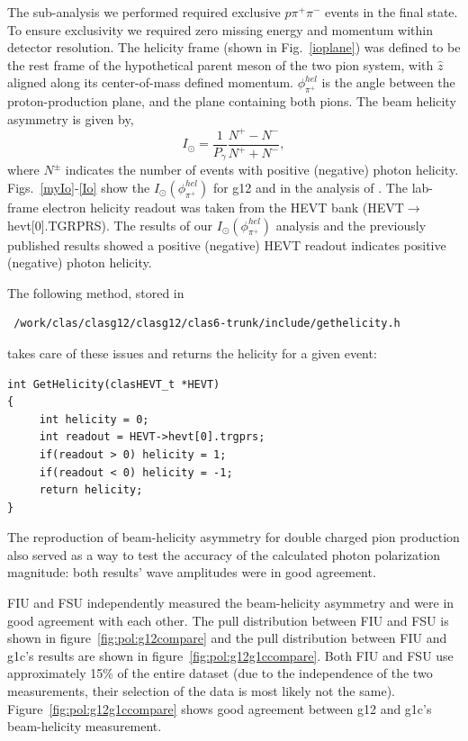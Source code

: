 The sub-analysis we performed required exclusive $p \pi^+ \pi^-$ events in the final state. To ensure exclusivity we required zero missing energy and momentum within detector resolution. The helicity frame (shown in Fig.~\ref{ioplane}) was defined to be the rest frame of the hypothetical parent meson of the two pion system, with  $\hat{z}$ aligned along its center-of-mass defined momentum. $\phi^{hel}_{\pi^+}$ is the angle between the proton-production plane, and the plane containing both pions. The beam helicity asymmetry is given by,
\begin{equation}
I_\odot = \frac{1}{P_{\gamma}} \frac{N^+ - N^-}{N^+ + N^-},
\end{equation}
where $N^\pm$ indicates the number of events with positive (negative) photon helicity.  Figs.~\ref{myIo}-\ref{Io} show the $I_{\odot}(\phi^{hel}_{\pi^+})$ for g12 and in the analysis of \cite{Io}.
The lab-frame electron helicity readout was taken from the HEVT bank (HEVT$\to$hevt[0].TGRPRS). The results of our $I_{\odot}(\phi^{hel}_{\pi^+})$ analysis and the previously published results showed a positive (negative) HEVT readout indicates positive (negative) photon helicity. \begin{v2}The following method, stored in\begin{verbatim} /work/clas/clasg12/clasg12/clas6-trunk/include/gethelicity.h \end{verbatim} takes care of these issues and returns the helicity for a given event:

\begin{verbatim}
int GetHelicity(clasHEVT_t *HEVT)
{
     int helicity = 0;
     int readout = HEVT->hevt[0].trgprs;
     if(readout > 0) helicity = 1;
     if(readout < 0) helicity = -1;
     return helicity;
}
\end{verbatim}
\end{v2}
The reproduction of beam-helicity asymmetry for double charged pion production also served as a way to test the accuracy of the calculated photon polarization magnitude: both results' wave amplitudes were in good agreement. \begin{v2}
FIU and FSU independently measured the beam-helicity asymmetry and were in good agreement with each other. The pull distribution between FIU and FSU is shown in figure~\ref{fig:pol:g12compare} and the pull distribution between FIU and g1c's results are shown in figure~\ref{fig:pol:g12g1ccompare}. Both FIU and FSU use approximately 15\% of the entire dataset (due to the independence of the two measurements, their selection of the data is most likely not the same). Figure~\ref{fig:pol:g12g1ccompare} shows good agreement between g12 and g1c's beam-helicity measurement.
\end{v2}

